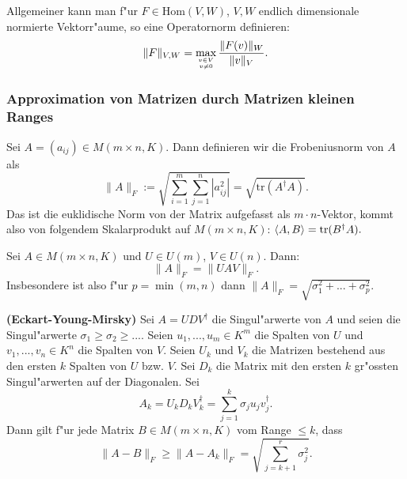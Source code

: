 \documentclass[8pt, a4paper, twocolumn, landscape]{article}
\begin{document}
\begin{remark}
Allgemeiner kann man f"ur $F \in \mathrm{Hom}(V, W)$, $V, W$ endlich dimensionale normierte Vektorr"aume, so eine Operatornorm definieren:
$$
\|F\|_{V, W} = \max\limits_{ v \in V \atop v \neq 0} \frac{\|F(v)\|_W}{\|v\|_V}.
$$
\end{remark}



\subsubsection{Approximation von Matrizen durch Matrizen kleinen Ranges}
\begin{definition}
Sei $A = (a_{ij}) \in M( m \times n, K)$. Dann definieren wir die Frobeniusnorm von $A$ als
$$
\|A\|_F := \sqrt{\sum\limits_{i = 1}^m \sum\limits_{j = 1}^n |a_{ij}^2|} = \sqrt{\mathrm{tr}(A^\dagger A)}.
$$
Das ist die euklidische Norm von der Matrix aufgefasst als $m \cdot n$-Vektor, kommt also von folgendem Skalarprodukt auf $M(m \times n, K)$:
$
\left\langle {A} , {B} \right\rangle = \mathrm{tr}(B^\dagger A).
$
\end{definition}



\begin{lemma}
Sei $A \in M( m \times n, K)$ und $U \in U(m)$, $V \in U(n)$. Dann:
$$
\| A \|_F = \|UAV\|_F.
$$
Insbesondere ist also f"ur $p = \min(m, n)$ dann
$
\|A\|_F =  \sqrt{\sigma_1^2 + ... + \sigma_p^2}.
$
\end{lemma}

\begin{theorem} \textbf{(Eckart-Young-Mirsky)} Sei $A = UDV^\dagger$ die Singul"arwerte von $A$ und seien die Singul"arwerte $\sigma_1 \geq  \sigma_2 \geq...$. Seien $u_1, ..., u_m \in K^m$ die Spalten von $U$ und $v_1, ..., v_n \in K^n$ die Spalten von $V$. Seien $U_k$ und $V_k$ die Matrizen bestehend aus den ersten $k$ Spalten von $U$ bzw. $V$. Sei $D_k$ die Matrix mit den ersten $k$ gr"ossten Singul"arwerten auf der Diagonalen. Sei 
$$
A_k = U_k D_k V_k^\dagger = \sum\limits_{j = 1}^k \sigma_j u_j v_j^\dagger.
$$
Dann gilt f"ur jede Matrix $B \in M( m \times n, K)$ vom Range $\leq k$, dass
$$
\|A - B\|_F \geq \|A - A_k \|_F = \sqrt{\sum\limits_{j = k+1}^r \sigma_j^2}.
$$
\end{theorem}
\end{document}
